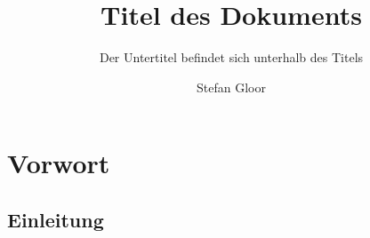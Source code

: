 \documentclass[a4paper]{book} %
\title{Titel des Dokuments}
\subtitle{Der Untertitel befindet sich unterhalb des Titels}
\author{Stefan Gloor}
\begin{document}
 
    \thispagestyle{TitlePageStyle} %
    \maketitle %
    \renewcommand{\cfttoctitlefont}{\sffamily \bfseries \Large}
    \renewcommand{\cftchapfont}{\sffamily \bfseries \large}
    \renewcommand{\cftsecfont}{\sffamily \bfseries}
    \renewcommand{\cftsubsecfont}{\sffamily}
    \renewcommand{\cftsubsubsecfont}{\sffamily}
    \renewcommand{\cftchappagefont}{\sffamily \bfseries \large}
    \renewcommand{\cftsecpagefont}{\sffamily \bfseries}
    \renewcommand{\cftsubsecpagefont}{\sffamily}
    \renewcommand{\cftsubsubsecpagefont}{\sffamily}
    \renewcommand{\cftchapaftersnum}{\bfseries\large.}
    \renewcommand{\cftsecaftersnum}{\bfseries.}
    \renewcommand{\cftsubsecaftersnum}{.}
    \renewcommand{\cftsubsubsecaftersnum}{.}
    \renewcommand{\cftbeforechapskip}{4mm}
    \renewcommand{\cftbeforesecskip}{2mm}
    \renewcommand{\cftbeforesubsecskip}{2mm}
    \renewcommand{\cftbeforesubsubsecskip}{2mm}
    \setlength{\cftbeforetoctitleskip}{0pt}
    \setlength{\cftaftertoctitleskip}{10pt}
    \tableofcontents
    \newpage
    


    \chapter{Vorwort}
         \section{Einleitung}
\end{document}
